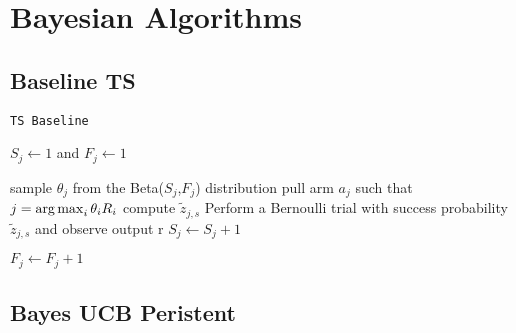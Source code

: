 \section{Bayesian Algorithms}

\subsection{Baseline TS}

\begin{algorithm}[H]
	\caption{\texttt{TS Baseline}}
	\begin{scriptsize}
		\begin{algorithmic}[1]
			
			
			
			
			
			 
				\State $S_j \gets 1$ and $F_j \gets 1$
			\EndFor
			
			  
				\State sample $\theta_j$ from the Beta($S_j$,$F_j$) distribution
				\EndFor
			\State pull arm $a_j$ such that $j = \operatorname*{arg\,max}_i \theta_iR_i$
			 
				\State compute $\tilde{z}_{j,s}$
				\State Perform a Bernoulli trial with success probability $\tilde{z}_{j,s}$ and observe output r
				 \;
				\State $S_j \gets S_j + 1$ \;
				
				\Else
				\State $F_j \gets F_j + 1$ \;
				
				\EndIf
				\EndIf		
			\EndFor
			
			\EndFor
			\EndFor
			
			
			\EndFunction
			
		\end{algorithmic}
	\end{scriptsize}
	\label{alg:TSBASELINE}
\end{algorithm}

\subsection{Bayes UCB Peristent}



